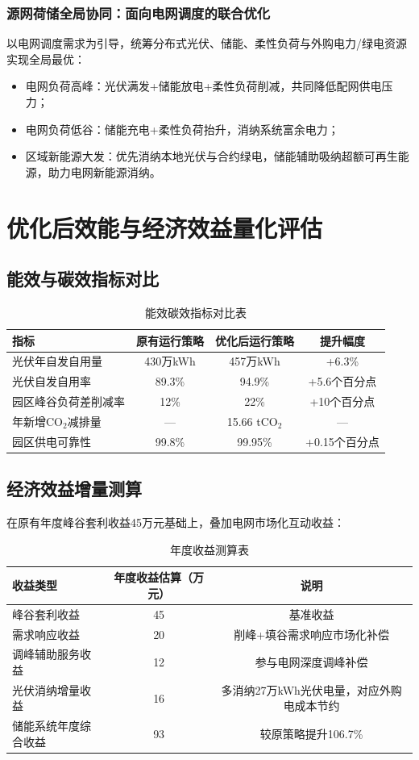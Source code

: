 \documentclass[12pt,a4paper]{article}
\begin{document}
\subsubsection{源网荷储全局协同：面向电网调度的联合优化}
以电网调度需求为引导，统筹分布式光伏、储能、柔性负荷与外购电力/绿电资源实现全局最优：
\begin{itemize}
    \item 电网负荷高峰：光伏满发+储能放电+柔性负荷削减，共同降低配网供电压力；
    \item 电网负荷低谷：储能充电+柔性负荷抬升，消纳系统富余电力；
    \item 区域新能源大发：优先消纳本地光伏与合约绿电，储能辅助吸纳超额可再生能源，助力电网新能源消纳。
\end{itemize}

\section{优化后效能与经济效益量化评估}
\subsection{能效与碳效指标对比}
\begin{table}[H]
\centering
\caption{能效碳效指标对比表}
\label{tab:index}
\begin{tabular}{lccc}
\toprule
指标 & 原有运行策略 & 优化后运行策略 & 提升幅度 \\
\midrule
光伏年自发自用量 & 430万kWh & 457万kWh & +6.3\% \\
光伏自发自用率 & 89.3\% & 94.9\% & +5.6个百分点 \\
园区峰谷负荷差削减率 & 12\% & 22\% & +10个百分点 \\
年新增CO$_2$减排量 & — & 15.66 tCO$_2$ & — \\
园区供电可靠性 & 99.8\% & 99.95\% & +0.15个百分点 \\
\bottomrule
\end{tabular}
\end{table}

\subsection{经济效益增量测算}
在原有年度峰谷套利收益45万元基础上，叠加电网市场化互动收益：
\begin{table}[H]
\centering
\caption{年度收益测算表}
\label{tab:profit}
\begin{tabular}{lcc}
\toprule
收益类型 & 年度收益估算（万元） & 说明 \\
\midrule
峰谷套利收益 & 45 & 基准收益 \\
需求响应收益 & 20 & 削峰+填谷需求响应市场化补偿 \\
调峰辅助服务收益 & 12 & 参与电网深度调峰补偿 \\
光伏消纳增量收益 & 16 & 多消纳27万kWh光伏电量，对应外购电成本节约 \\
储能系统年度综合收益 & 93 & 较原策略提升106.7\% \\
\bottomrule
\end{tabular}
\end{table}
\end{document}
